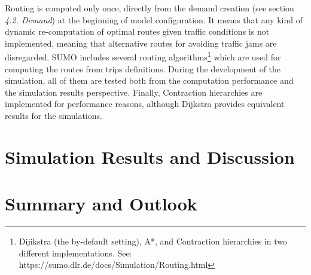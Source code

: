 \documentclass[11pt]{article}
\begin{document}

Routing is computed only once, directly from the demand creation (see section \textit{4.2. Demand}) at the beginning of model configuration. It means that any kind of dynamic re-computation of optimal routes given traffic conditions is not implemented, meaning that alternative routes for avoiding traffic jams are disregarded. SUMO includes several routing algorithms\footnote{Dijikstra (the by-default setting), A*, and Contraction hierarchies in two different implementations. See: https://sumo.dlr.de/docs/Simulation/Routing.html} which are used for computing the routes from trips definitions. During the development of the simulation, all of them are tested both from the computation performance and the simulation results perspective. Finally, Contraction hierarchies are implemented for performance reasons, although Dijkstra provides equivalent results for the simulations.

\section{Simulation Results and Discussion}



\section{Summary and Outlook}



\end{document}
